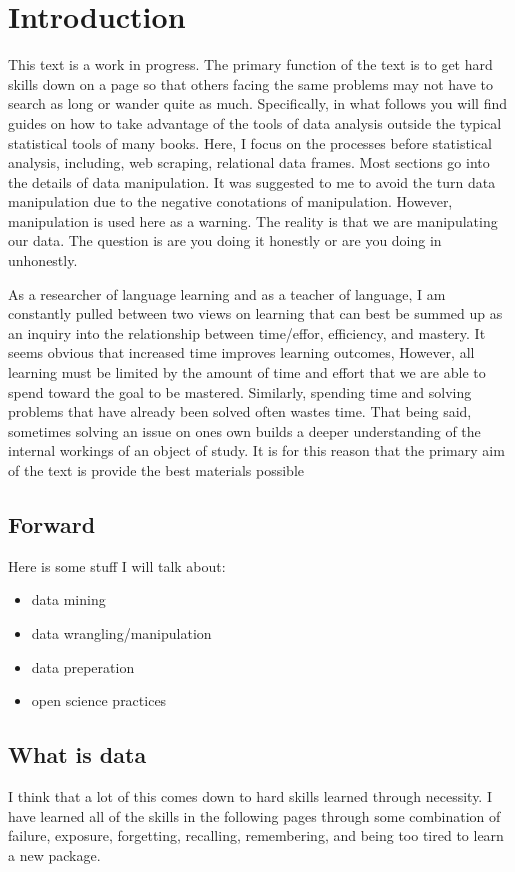 \section{Introduction} \label{sec:phasellus}

This text is a work in progress. The primary function of the text is to get hard skills down on a page so that others facing the same problems may not have to search as long or wander quite as much. Specifically, in what follows you will find guides on how to take advantage of the tools of data analysis outside the typical statistical tools of many books. Here, I focus on the processes before statistical analysis, including, web scraping, relational data frames. Most sections go into the details of data manipulation. It was suggested to me to avoid the turn data manipulation due to the negative conotations of manipulation. However, manipulation is used here as a warning. The reality is that we are manipulating our data. The question is are you doing it honestly or are you doing in unhonestly. 

As a researcher of language learning and as a teacher of language, I am constantly pulled between two views on learning that can best be summed up as an inquiry into the relationship between time/effor, efficiency, and mastery. It seems obvious that increased time improves learning outcomes, However, all learning must be limited by the amount of time and effort that we are able to spend toward the goal to be mastered. Similarly, spending time and solving problems that have already been solved often wastes time. That being said, sometimes solving an issue on ones own builds a deeper understanding of the internal workings of an object of study. It is for this reason that the primary aim of the text is    provide the best materials possible 



\subsection{Forward}

Here is some stuff I will talk about:

\begin{itemize}
\item{data mining}
\item{data wrangling/manipulation}
\item{data preperation}
\item{open science practices}
\end{itemize}


\newpage
\subsection{What is data}

\begin{remark}
I think that a lot of this comes down to hard skills learned through necessity. I have learned all of the skills in the following pages through some combination of failure, exposure, forgetting, recalling, remembering, and being too tired to learn a new package.
\end{remark}
